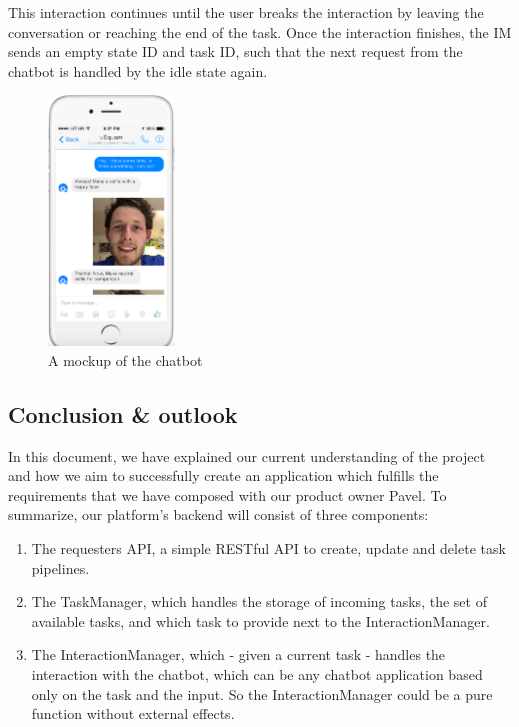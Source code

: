 \documentclass[a4paper,dutch,fleqn]{exam}
\begin{document}
This interaction continues until the user breaks the interaction by leaving the conversation or reaching the end of the task. Once the interaction finishes, the IM sends an empty state ID and task ID, such that the next request from the chatbot is handled by the idle state again. 

\begin{figure}
 \begin{center}
    \includegraphics[width=0.3\textwidth]{image01}
  \end{center}
    \caption{A mockup of the chatbot}
\end{figure}

\subsection{Conclusion \& outlook}
In this document, we have explained our current understanding of the project and how we aim to successfully create an application which fulfills the requirements that we have composed with our product owner Pavel. 
To summarize, our platform's backend will consist of three components: 
\begin{enumerate}
\item The requesters API, a simple RESTful API to create, update and delete task pipelines. 
\item The TaskManager, which handles the storage of incoming tasks, the set of available tasks, and which task to provide next to the InteractionManager.
\item The InteractionManager, which - given a current task - handles the interaction with the chatbot, which can be any chatbot application based only on the task and the input. So the InteractionManager could be a pure function without external effects. 
\end{enumerate}
\end{document}
